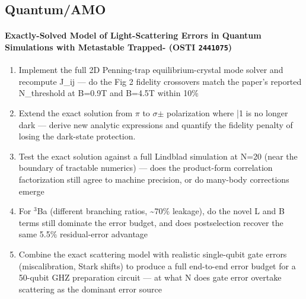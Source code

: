 \subsection*{Quantum/AMO}
\paragraph{Exactly-Solved Model of Light-Scattering Errors in Quantum Simulations with Metastable Trapped- \textnormal{\small(OSTI \texttt{2441075})}}
\begin{enumerate}[leftmargin=1.6em,itemsep=0.2em,topsep=0.2em,label=Q\arabic*.]
\item Implement the full 2D Penning-trap equilibrium-crystal mode solver and recompute J\_ij --- do the Fig 2 fidelity crossovers match the paper's reported N\_threshold at B=0.9T and B=4.5T within 10\%
\item Extend the exact solution from $\pi$ to $\sigma$$\pm$ polarization where |1 is no longer dark --- derive new analytic expressions and quantify the fidelity penalty of losing the dark-state protection.
\item Test the exact solution against a full Lindblad simulation at N=20 (near the boundary of tractable numerics) --- does the product-form correlation factorization still agree to machine precision, or do many-body corrections emerge
\item For $^3$Ba (different branching ratios, \textasciitilde{}70\% leakage), do the novel L and B terms still dominate the error budget, and does postselection recover the same 5.5\% residual-error advantage
\item Combine the exact scattering model with realistic single-qubit gate errors (miscalibration, Stark shifts) to produce a full end-to-end error budget for a 50-qubit GHZ preparation circuit --- at what N does gate error overtake scattering as the dominant error source
\end{enumerate}
